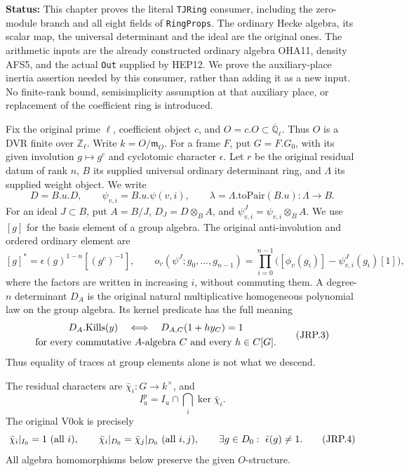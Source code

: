 \documentclass[11pt,a4paper]{article}
\numberwithin{equation}{section}
\theoremstyle{remark}\newtheorem{remark}[theorem]{Remark}
\newcommand{\status}[1]{\textbf{Status:} #1}
\begin{document}
\status{This chapter proves the literal \texttt{TJRing} consumer, including
the zero-module branch and all eight fields of \texttt{Ring\allowbreak Props}.  The
ordinary Hecke algebra, its scalar map, the universal determinant and the
ideal are the original ones.  The arithmetic inputs are the already
constructed ordinary algebra OHA11, density AFS5, and the actual
\texttt{Out} supplied by HEP12.  We prove the auxiliary-place inertia
assertion needed by this consumer, rather than adding it as a new input.
No finite-rank bound, semisimplicity assumption at that auxiliary place,
or replacement of the coefficient ring is introduced.}

Fix the original prime \(\ell\), coefficient object \(c\), and
\(O=c.O\subset\overline{\mathbb Q}_\ell\).  Thus \(O\) is a DVR
finite over \(\mathbb Z_\ell\).  Write \(k=O/\mathfrak m_O\).
For a frame \(F\), put \(G=F.G_0\), with its given involution
\(g\mapsto g^c\) and cyclotomic character \(\epsilon\).  Let
\(r\) be the original residual datum of rank \(n\),
\(B\) its supplied universal ordinary determinant ring, and
\(\Lambda\) its supplied weight object.  We write
\[
 D=B.u.D,\qquad \psi_{v,i}=B.u.\psi(v,i),\qquad
 \lambda=\Lambda.\mathrm{toPair}(B.u):\Lambda\longrightarrow B.
 \tag{JRP.1}
\]
For an ideal \(J\subset B\), put \(A=B/J\),
\(D_J=D\otimes_B A\), and \(\psi^J_{v,i}=\psi_{v,i}\otimes_B A\).
We use \([g]\) for the basis element of a group algebra.  The original
anti-involution and ordered ordinary element are
\[
 [g]^*=\epsilon(g)^{1-n}[(g^c)^{-1}],\qquad
 o_v(\psi^J;g_0,\ldots,g_{n-1})=
       \prod_{i=0}^{n-1}\bigl([\phi_v(g_i)]-\psi^J_{v,i}(g_i)[1]\bigr),
 \tag{JRP.2}
\]
where the factors are written in increasing \(i\), without commuting
them.  A degree-\(n\) determinant \(D_A\) is the original natural
multiplicative homogeneous polynomial law on the group algebra.
Its kernel predicate has the full meaning
\[
 \begin{gathered}
 D_A.\mathrm{Kills}(y)\quad\Longleftrightarrow\quad
 D_{A,C}(1+h y_C)=1\\
 \hbox{for every commutative \(A\)-algebra \(C\) and every \(h\in C[G]\)}.
 \end{gathered}
 \tag{JRP.3}
\]
Thus equality of traces at group elements alone is not what we descend.

The residual characters are \(\bar\chi_i:G\to k^\times\), and
\[
 I^p_u=I_u\cap\bigcap_i\ker\bar\chi_i.
\]
The original \(\mathrm{V0ok}\) is precisely
\[
 \bar\chi_i|_{I_0}=1\ (\hbox{all }i),\qquad
 \bar\chi_i|_{D_0}=\bar\chi_j|_{D_0}\ (\hbox{all }i,j),\qquad
 \exists g\in D_0:\ \bar\epsilon(g)\ne1.
 \tag{JRP.4}
\]
All algebra homomorphisms below preserve the given \(O\)-structure.
\end{document}
